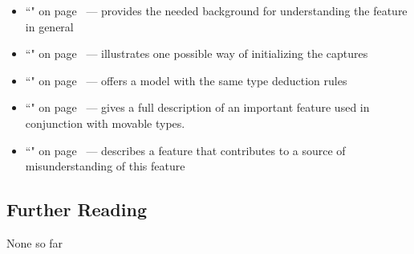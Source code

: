 \begin{itemize}
\item{``" on page~\pageref{lambda} — provides the needed background for understanding the feature in general}
\item{``" on page~\pageref{bracedinit} — illustrates one possible way of initializing the captures}
\item{``" on page~\pageref{auto-feature} — offers a model with the same type deduction rules}
\item{``" on page~\pageref{Rvalue-References} — gives a full description of an important feature used in conjunction with movable types.}
\item{``" on page~\pageref{forwardingref} — describes a feature that contributes to a source of misunderstanding of this feature}
\end{itemize}

\subsection[Further Reading]{Further Reading}\label{further-reading}

None so far


